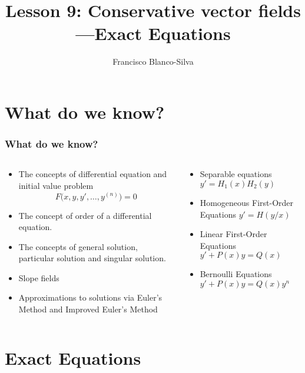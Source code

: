 \documentclass[10pt,xcolor=x11names,compress]{beamer}
\author[Francisco Blanco-Silva]{Francisco Blanco-Silva}
\institute[USC]{University of South Carolina}
\date{
	\begin{tikzpicture}[decoration=Koch curve type 2] 
		\draw[DeepSkyBlue4] decorate{ decorate{ decorate{ (0,0) -- (3,0) }}}; 
	\end{tikzpicture}  
	\\
	\today
}
\title{Lesson 9: Conservative vector fields---Exact Equations}
\begin{document}
\frame{\titlepage}

\section{What do we know?}
\begin{frame}\frametitle{What do we know?}
\begin{columns}[T]
\begin{column}{0.6\linewidth}
\begin{itemize}
\item The concepts of \alert{differential equation} and \alert{initial value problem}
\begin{equation*}
F\big(x,y,y',\dotsc,y^{(n)}\big)=0
\end{equation*}
\item The concept of \alert{order} of a differential equation.
\item The concepts of \alert{general solution}, \alert{particular solution} and \alert{singular solution}.
\item \alert{Slope fields}
\item Approximations to solutions via \alert{Euler's Method} and \alert{Improved Euler's Method}
\end{itemize} 
\end{column}
\begin{column}{0.4\linewidth}
\begin{itemize}
\item Separable equations $y'=H_1(x) H_2(y)$
\item Homogeneous First-Order Equations $y'=H(y/x)$
\item Linear First-Order Equations $y'+P(x)y=Q(x)$
\item Bernoulli Equations $y'+P(x)y=Q(x)y^n$
\end{itemize}
\end{column}
\end{columns}
\end{frame}

\section{Exact Equations}
\end{document}
